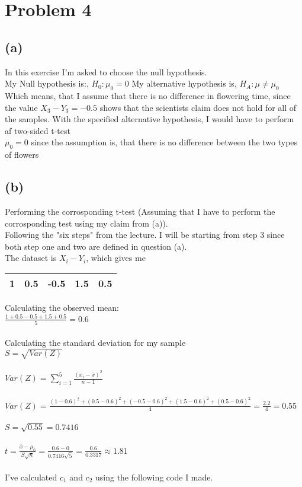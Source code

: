 \section{Problem 4}
\subsection{(a)}
In this exercise I'm asked to choose the null hypothesis.
\\
My Null hypothesis is:, $ H_0 : \mu_0 = 0 $
My alternative hypothesis is, $H_A : \mu \neq \mu_0$
\\
Which means, that I assume that there is no difference in flowering time, since the value $X_3 - Y_3 = -0.5$ shows that
the scientists claim does not hold for all of the samples. With the specified
alternative hypothesis, I would have to perform af two-sided t-test
\\
$ \mu_0 = 0 $ since the assumption is, that there is no difference between the two types of flowers

\subsection{(b)}
Performing the corrosponding t-test (Assuming that I have to perform the corrosponding test using my claim from (a)).
\\
Following the "six steps" from the lecture. I will be starting from step 3 since both step one and two are defined in question (a).
\\
The dataset is $ X_i - Y_i $, which gives me

\begin{center}
    \begin{tabular}{ |c|c|c|c|c| } 
     \hline
      1 & 0.5 & -0.5 & 1.5 & 0.5\\ 
     \hline
    \end{tabular}
\end{center}

\noindent Calculating the observed mean:\\
$ \frac{1 + 0.5 - 0.5 + 1.5 + 0.5}{5} = 0.6 $
\\
\\
Calculating the standard deviation for my sample \\
$ S = \sqrt{Var(Z)}$ \\
\\
$ Var(Z) = \sum_{i=1}^{5} \frac{(x_i - \overline{x})^2}{n-1} $ \\
\\
$ Var(Z) = \frac{(1 - 0.6)^2 + (0.5 - 0.6)^2 + (-0.5 - 0.6)^2 + (1.5 - 0.6)^2 + (0.5 - 0.6)^2}{4} = \frac{2.2}{4} = 0.55 $  
\\
\\
$ S = \sqrt{0.55} = 0.7416$
\\
\\
$t = \frac{\overline{x} - \mu_0}{S \sqrt{n}} = \frac{0.6 - 0}{0.7416 \sqrt{5}} = \frac{0.6}{0.3317} \approx 1.81 $
\\
\\
I've calculated $c_{1}$ and $c_{2}$ using the following code I made.

